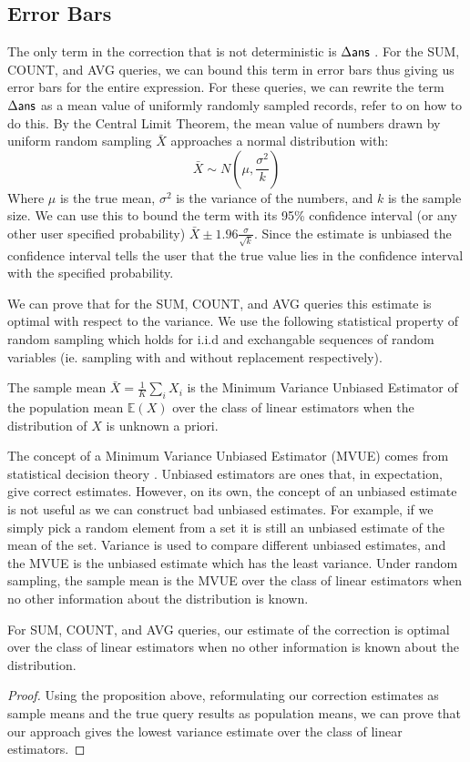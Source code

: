 \subsection{Error Bars}\label{subsec:correct-practical}
The only term in the correction that is not deterministic is $\Delta\textsf{ans}$ .
For the SUM, COUNT, and AVG queries, we can bound this term in error bars thus giving us error bars for the entire expression.
For these queries, we can rewrite the term $\Delta\textsf{ans}$ as a mean value of uniformly randomly sampled records, refer to \cite{wang1999sample} on how to do this.
By the Central Limit Theorem, the mean value of numbers drawn by uniform random sampling $\bar{X}$ approaches a normal distribution with:
\[
\bar{X} \sim N(\mu,\frac{\sigma^2}{k})
\]
Where $\mu$ is the true mean, $\sigma^2$ is the variance of the numbers, and $k$ is the sample size.
We can use this to bound the term with its 95\% confidence interval (or any other user specified probability) $\bar{X} \pm 1.96 \frac{\sigma}{\sqrt{k}}$.
Since the estimate is unbiased the confidence interval tells the user that the true value lies in the confidence interval with the specified probability.

We can prove that for the SUM, COUNT, and AVG queries this estimate is optimal with respect to the variance.
We use the following statistical property of random sampling which holds for i.i.d and exchangable sequences of random variables (ie. sampling with and without replacement respectively).
\begin{proposition}
The sample mean $\bar{X} = \frac{1}{K}\sum_i X_i$ is the Minimum Variance Unbiased Estimator of the population mean $\mathbb{E}(X)$ over the class of linear estimators when the distribution of $X$ is unknown a priori.
\end{proposition}
The concept of a Minimum Variance Unbiased Estimator (MVUE) comes from statistical decision theory \cite{cox1979theoretical}.
Unbiased estimators are ones that, in expectation, give correct estimates.
However, on its own, the concept of an unbiased estimate is not useful as we can construct bad unbiased estimates.
For example, if we simply pick a random element from a set it is still an unbiased estimate of the mean of the set.
Variance is used to compare different unbiased estimates, and the MVUE is the unbiased estimate which has the least variance.
Under random sampling, the sample mean is the MVUE over the class of linear estimators when no other information about the distribution is known.
\begin{theorem}
For SUM, COUNT, and AVG queries, our estimate of the correction is optimal over the class of linear estimators when no other information is known about the distribution. 
\end{theorem}
\begin{proof}
Using the proposition above, reformulating our correction estimates as sample means and the true query results as population means, we can prove that our approach gives the lowest variance estimate over the class of linear estimators.
\end{proof}